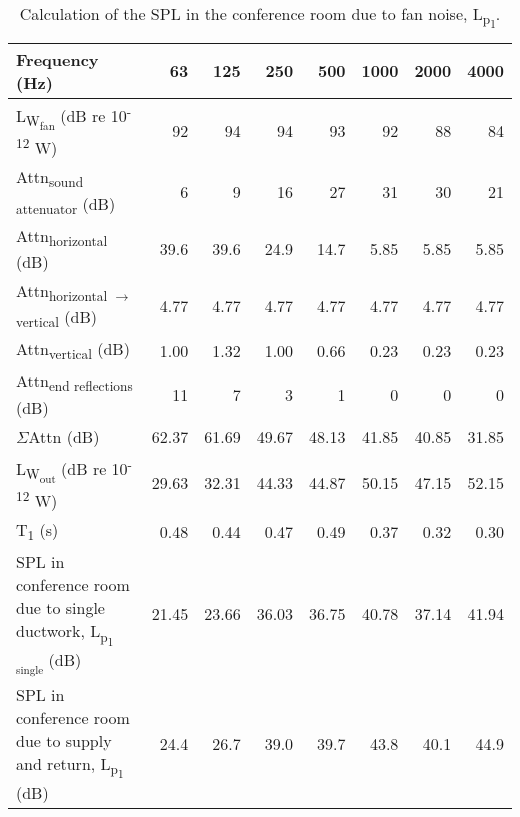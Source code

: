 \begin{table}[htbp]
	\caption{Calculation of the SPL in the conference room due to fan noise, L\textsubscript{p\textsubscript{1}}.}
	\label{tbl:BN_conf}
	\centering
	\begin{tabular}{@{}lrrrrrrr@{}}
		\toprule
		Frequency (Hz) & 63 & 125 & 250 & 500 & 1000 & 2000 & 4000 \\ \midrule
		L\textsubscript{W\textsubscript{fan}} (dB re 10\textsuperscript{-12} W) & 92 & 94 & 94 & 93 & 92 & 88 & 84 \\
		Attn\textsubscript{sound attenuator} (dB) & 6 & 9 & 16 & 27 & 31 & 30 & 21 \\
		Attn\textsubscript{horizontal} (dB) & 39.6 & 39.6 & 24.9 & 14.7 & 5.85 & 5.85 & 5.85 \\
		Attn\textsubscript{horizontal $\rightarrow$ vertical} (dB) & 4.77 & 4.77 & 4.77 & 4.77 & 4.77 & 4.77 & 4.77 \\
		Attn\textsubscript{vertical} (dB) & 1.00 & 1.32 & 1.00 & 0.66 & 0.23 & 0.23 & 0.23 \\
		Attn\textsubscript{end reflections} (dB) & 11 & 7 & 3 & 1 & 0 & 0 & 0 \\
		$\Sigma$Attn (dB) & 62.37 & 61.69 & 49.67 & 48.13 & 41.85 & 40.85 & 31.85 \\
		L\textsubscript{W\textsubscript{out}} (dB re 10\textsuperscript{-12} W) & 29.63 & 32.31 & 44.33 & 44.87 & 50.15 & 47.15 & 52.15 \\
		T\textsubscript{1} (s) & 0.48 & 0.44 & 0.47 & 0.49 & 0.37 & 0.32 & 0.30 \\
		SPL in conference room due to single ductwork, L\textsubscript{p\textsubscript{1 single}} (dB) & 21.45 & 23.66 & 36.03 & 36.75 & 40.78 & 37.14 & 41.94 \\
		SPL in conference room due to supply and return, L\textsubscript{p\textsubscript{1}} (dB) & 24.4 & 26.7 & 39.0 & 39.7 & 43.8 & 40.1 & 44.9 \\ \bottomrule
	\end{tabular}
\end{table}